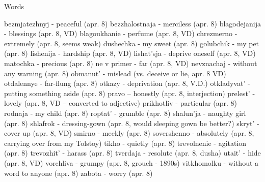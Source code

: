 Words

bezmjatezhnyj - peaceful (apr. 8)
bezzhalostnaja - merciless (apr. 8)
blagodejanija - blessings (apr. 8, VD)
blagoukhanie - perfume (apr. 8, VD)
chrezmerno - extremely (apr. 8, seems weak)
dushechka - my sweet (apr. 8)
golubchik - my pet (apr. 8)
lishenija - hardship (apr. 8, VD)
lishat'sja - deprive oneself (apr. 8, VD)
matochka - precious (apr. 8)
ne v primer - far (apr. 8, VD)
nevznachaj - without any warning (apr. 8)
obmanut' - mislead (vs. deceive or lie, apr. 8 VD)
otdalennye - far-flung (apr. 8)
otkazy - deprivation (apr. 8, V.D.)
otkladyvat' - putting something aside (apr. 8)
pravo -- honestly (apr. 8, interjection)
prelest' - lovely (apr. 8, VD -- converted to adjective)
prikhotliv - particular (apr. 8)
rodnaja - my child (apr. 8)
roptat' - grumble (apr. 8)
shalun'ja - naughty girl (apr. 8)
shlafrok - dressing-gown (apr. 8, would sleeping gown be better?)
skryt' - cover up (apr. 8, VD)
smirno - meekly (apr. 8)
sovershenno - absolutely (apr. 8, carrying over from my Tolstoy)
tikho - quietly (apr. 8)
trevolnenie - agitation (apr. 8)
trevozhit' - harass (apr. 8)
tverdaja - resolute (apr. 8, dusha)
utait' - hide (apr. 8, VD)
vorchliva - grumpy (apr. 8, grouch - 1890s)
vitkhomolku - without a word to anyone (apr. 8)
zabota - worry (apr. 8)